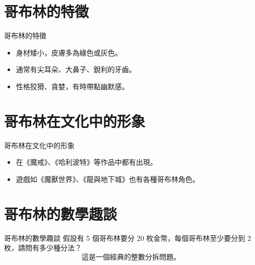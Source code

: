 \documentclass{beamer}
\begin{document}
\section{哥布林的特徵}
\begin{frame}{哥布林的特徵}
    \begin{itemize}
        \item 身材矮小，皮膚多為綠色或灰色。
        \item 通常有尖耳朵、大鼻子、銳利的牙齒。
        \item 性格狡猾、貪婪，有時帶點幽默感。
    \end{itemize}
\end{frame}

\section{哥布林在文化中的形象}
\begin{frame}{哥布林在文化中的形象}
    \begin{itemize}
        \item 在《魔戒》、《哈利波特》等作品中都有出現。
        \item 遊戲如《魔獸世界》、《龍與地下城》也有各種哥布林角色。
    \end{itemize}
\end{frame}

\section{哥布林的數學趣談}
\begin{frame}{哥布林的數學趣談}
    假設有 5 個哥布林要分 20 枚金幣，每個哥布林至少要分到 2 枚，請問有多少種分法？
    \[
    \text{這是一個經典的整數分拆問題。}
    \]
\end{frame}
\end{document}
